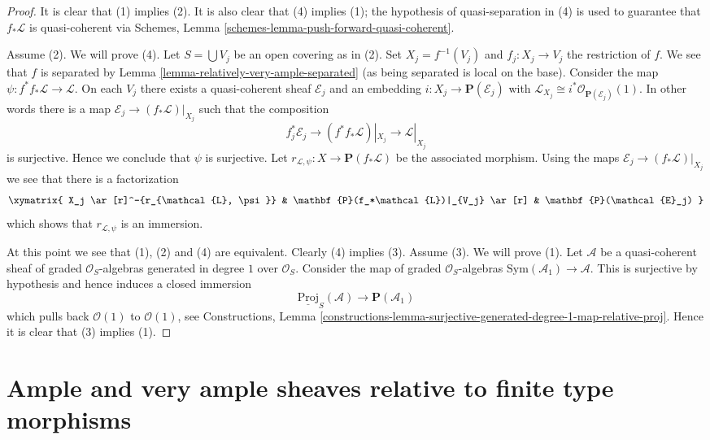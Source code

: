 \begin{proof}
It is clear that (1) implies (2). It is also clear that
(4) implies (1); the hypothesis of quasi-separation
in (4) is used to guarantee that $f_*\mathcal{L}$ is quasi-coherent via
Schemes, Lemma \ref{schemes-lemma-push-forward-quasi-coherent}.

\medskip\noindent
Assume (2).
We will prove (4).
Let $S = \bigcup V_j$ be an open covering as in (2).
Set $X_j = f^{-1}(V_j)$ and $f_j : X_j \to V_j$ the
restriction of $f$. We see that $f$ is separated by
Lemma \ref{lemma-relatively-very-ample-separated} (as being
separated is local on the base). Consider the map
$\psi : f^*f_*\mathcal{L} \to \mathcal{L}$. On each $V_j$ there exists a
quasi-coherent sheaf $\mathcal{E}_j$ and an embedding
$i : X_j \to \mathbf{P}(\mathcal{E}_j)$ with
$\mathcal{L}_{X_j} \cong i^*\mathcal{O}_{\mathbf{P}(\mathcal{E}_j)}(1)$.
In other words there is a map $\mathcal{E}_j \to (f_*\mathcal{L})|_{X_j}$
such that the composition
$$
f_j^*\mathcal{E}_j \to (f^*f_*\mathcal{L})|_{X_j} \to \mathcal{L}|_{X_j}
$$
is surjective. Hence we conclude that $\psi$ is surjective. Let
$r_{\mathcal{L}, \psi} : X \to \mathbf{P}(f_*\mathcal{L})$ be the
associated morphism.
Using the maps $\mathcal{E}_j \to (f_*\mathcal{L})|_{X_j}$
we see that there is a factorization
$$
\xymatrix{
X_j \ar[r]^-{r_{\mathcal{L}, \psi}} &
\mathbf{P}(f_*\mathcal{L})|_{V_j} \ar[r] &
\mathbf{P}(\mathcal{E}_j)
}
$$
which shows that $r_{\mathcal{L}, \psi}$ is an immersion.

\medskip\noindent
At this point we see that (1), (2) and (4) are equivalent.
Clearly (4) implies (3). Assume (3). We will prove (1).
Let $\mathcal{A}$ be a quasi-coherent sheaf of graded $\mathcal{O}_S$-algebras
generated in degree $1$ over $\mathcal{O}_S$. Consider the map of
graded $\mathcal{O}_S$-algebras $\text{Sym}(\mathcal{A}_1) \to \mathcal{A}$.
This is surjective by hypothesis and hence induces a closed immersion
$$
\underline{\text{Proj}}_S(\mathcal{A})
\longrightarrow
\mathbf{P}(\mathcal{A}_1)
$$
which pulls back $\mathcal{O}(1)$ to $\mathcal{O}(1)$,
see Constructions, Lemma
\ref{constructions-lemma-surjective-generated-degree-1-map-relative-proj}.
Hence it is clear that (3) implies (1).
\end{proof}






\section{Ample and very ample sheaves relative to finite type morphisms}
\label{section-ample-finite-type}

